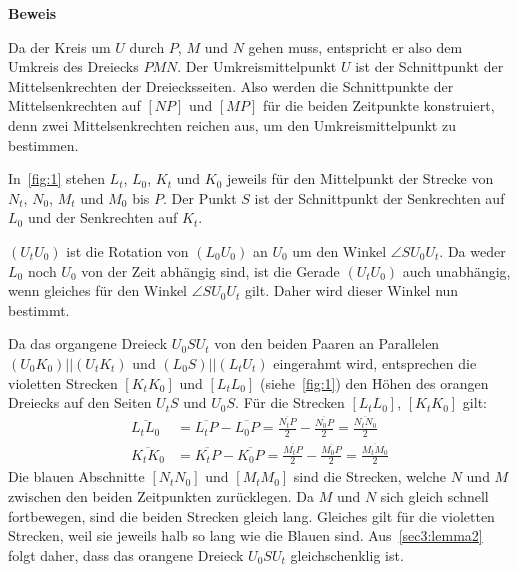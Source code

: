 \documentclass[10pt, a4paper, reqno]{amsart}
\makeatletter
\renewcommand\proofname{Beweis}
\renewenvironment{proof}[1][\proofname]{\par
\pushQED{\qed}%
\normalfont \topsep6\p@\@plus6\p@\relax
\trivlist
\item\relax
{\bfseries#1}\hspace\labelsep\ignorespaces
}{%
\popQED\endtrivlist\@endpefalse
}
\makeatother
\begin{document}
\begin{proof}
\begin{figure}[h]
    \caption{}
    \label{fig:1}
  \end{figure}

  Da der Kreis um $U$ durch $P$, $M$ und $N$ gehen muss, entspricht er also dem
  Umkreis des Dreiecks $PMN$. Der Umkreismittelpunkt $U$ ist der Schnittpunkt der Mittelsenkrechten
  der Dreiecksseiten. Also werden die Schnittpunkte der Mittelsenkrechten auf $[NP]$
  und $[MP]$ für die beiden Zeitpunkte konstruiert, denn zwei Mittelsenkrechten
  reichen aus, um den Umkreismittelpunkt zu bestimmen.
  
  In~\autoref{fig:1} stehen $L_t$, $L_0$, $K_t$ und $K_0$ jeweils für den
  Mittelpunkt der Strecke von $N_t$, $N_0$, $M_t$ und $M_0$ bis $P$. Der Punkt
  $S$ ist der Schnittpunkt der Senkrechten auf $L_0$ und der Senkrechten auf
  $K_t$.

  $(U_tU_0)$ ist die Rotation von $(L_0U_0)$ an $U_0$ um den Winkel $\angle
  SU_0U_t$. Da weder $L_0$ noch $U_0$ von der Zeit abhängig sind, ist die
  Gerade $(U_tU_0)$ auch unabhängig, wenn gleiches für den Winkel $\angle
  SU_0U_t$ gilt. Daher wird dieser Winkel nun bestimmt.
  
  Da das organgene Dreieck $U_0SU_t$ von den beiden Paaren an Parallelen
  $(U_0K_0) || (U_tK_t)$ und $(L_0S) || (L_tU_t)$ eingerahmt wird, entsprechen
  die violetten Strecken $[K_tK_0]$ und $[L_tL_0]$ (siehe~\autoref{fig:1}) den Höhen des orangen
  Dreiecks auf den Seiten $U_tS$ und $U_0S$. Für die Strecken $[L_tL_0]$,
  $[K_tK_0]$ gilt:
  \begin{align*}
    \overline{L_tL_0}&=\overline{L_tP}-\overline{L_0P}=\frac{\overline{N_tP}}{2} - \frac{\overline{N_0P}}{2} = \frac{\overline{N_tN_0}}{2}\\
    \overline{K_tK_0}&=\overline{K_tP}-\overline{K_0P}=\frac{\overline{M_tP}}{2} - \frac{\overline{M_0P}}{2} = \frac{\overline{M_tM_0}}{2}
  \end{align*}
  Die blauen Abschnitte $[N_tN_0]$ und $[M_tM_0]$ sind die Strecken, welche $N$ und $M$ zwischen den
  beiden Zeitpunkten zurücklegen. Da $M$ und $N$ sich gleich
  schnell fortbewegen, sind die beiden Strecken gleich lang. Gleiches gilt für
  die violetten Strecken, weil sie jeweils halb so lang wie die Blauen sind.
  Aus~\autoref{sec3:lemma2} folgt daher, dass das orangene Dreieck $U_0SU_t$
  gleichschenklig ist.


\end{proof}
\end{document}
